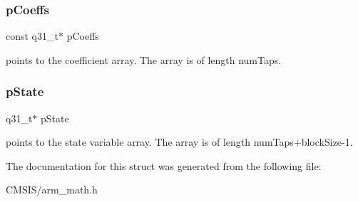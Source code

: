 \subsubsection{\texorpdfstring{pCoeffs}{pCoeffs}}
{\footnotesize\ttfamily const q31\+\_\+t$\ast$ p\+Coeffs}

points to the coefficient array. The array is of length num\+Taps. \mbox{\label{structarm__fir__instance__q31_adee4ba3ee8869865af7d8fa08ca913d6}} 
\subsubsection{\texorpdfstring{pState}{pState}}
{\footnotesize\ttfamily q31\+\_\+t$\ast$ p\+State}

points to the state variable array. The array is of length num\+Taps+block\+Size-\/1. 

The documentation for this struct was generated from the following file\+:\begin{DoxyCompactItemize}
\item 
C\+M\+S\+I\+S/arm\+\_\+math.\+h\end{DoxyCompactItemize}
